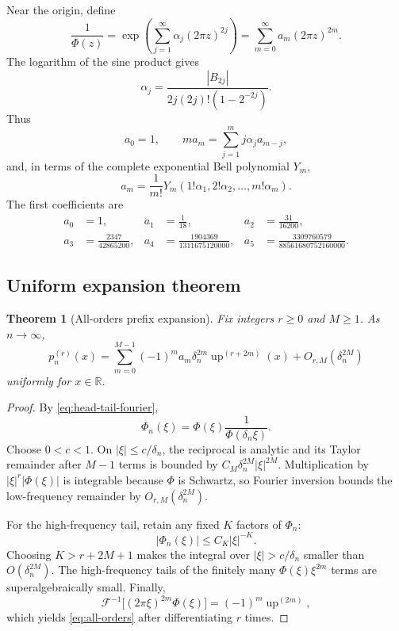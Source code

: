 \documentclass[11pt]{article}
\newtheorem{theorem}{Theorem}[section]
\theoremstyle{definition}
\theoremstyle{remark}
\newcommand{\R}{\mathbb R}
\newcommand{\Up}{\operatorname{up}}
\newcommand{\Fourier}{\mathcal F}
\begin{document}
Near the origin, define
\begin{equation}
 \frac1{\Phi(z)}
 =\exp\!\left(\sum_{j=1}^{\infty}\alpha_j(2\pi z)^{2j}\right)
 =\sum_{m=0}^{\infty}a_m(2\pi z)^{2m}.
 \label{eq:reciprocal-series}
\end{equation}
The logarithm of the sine product gives
\begin{equation}
 \alpha_j=\frac{|B_{2j}|}{2j(2j)!(1-2^{-2j})}.
 \label{eq:alpha-Bernoulli}
\end{equation}
Thus
\begin{equation}
 a_0=1,
 \qquad
 ma_m=\sum_{j=1}^{m}j\alpha_j a_{m-j},
 \label{eq:a-recurrence}
\end{equation}
and, in terms of the complete exponential Bell polynomial $Y_m$,
\begin{equation}
 a_m=\frac1{m!}Y_m(1!\alpha_1,2!\alpha_2,\ldots,m!\alpha_m).
 \label{eq:a-Bell}
\end{equation}
The first coefficients are
\begin{equation}
\begin{aligned}
 a_0&=1,&
 a_1&=\frac1{18},&
 a_2&=\frac{31}{16200},\\
 a_3&=\frac{2347}{42865200},&
 a_4&=\frac{1904369}{1311675120000},&
 a_5&=\frac{3309760579}{88561680752160000}.
\end{aligned}
 \label{eq:first-a}
\end{equation}

\subsection{Uniform expansion theorem}

\begin{theorem}[All-orders prefix expansion]
\label{thm:all-orders}
Fix integers $r\ge0$ and $M\ge1$.  As $n\to\infty$,
\begin{equation}
 \boxed{
 p_n^{(r)}(x)=
 \sum_{m=0}^{M-1}(-1)^m a_m\delta_n^{2m}\Up^{(r+2m)}(x)
 +O_{r,M}(\delta_n^{2M})}
 \label{eq:all-orders}
\end{equation}
uniformly for $x\in\R$.
\end{theorem}

\begin{proof}
By \cref{eq:head-tail-fourier},
\[
 \Phi_n(\xi)=\Phi(\xi)\frac1{\Phi(\delta_n\xi)}.
\]
Choose $0<c<1$.  On $|\xi|\le c/\delta_n$, the reciprocal is analytic and its Taylor
remainder after $M-1$ terms is bounded by
$C_M\delta_n^{2M}|\xi|^{2M}$.  Multiplication by
$|\xi|^r|\Phi(\xi)|$ is integrable because $\Phi$ is Schwartz, so Fourier inversion
bounds the low-frequency remainder by $O_{r,M}(\delta_n^{2M})$.

For the high-frequency tail, retain any fixed $K$ factors of $\Phi_n$:
\[
 |\Phi_n(\xi)|\le C_K|\xi|^{-K}.
\]
Choosing $K>r+2M+1$ makes the integral over $|\xi|>c/\delta_n$ smaller than
$O(\delta_n^{2M})$.  The high-frequency tails of the finitely many $\Phi(\xi)\xi^{2m}$
terms are superalgebraically small.  Finally,
\[
 \Fourier^{-1}\bigl[(2\pi\xi)^{2m}\Phi(\xi)\bigr]
 =(-1)^m\Up^{(2m)},
\]
which yields \cref{eq:all-orders} after differentiating $r$ times.
\end{proof}
\end{document}
